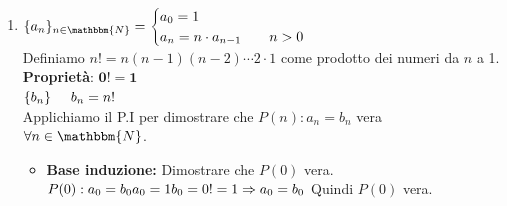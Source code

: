 \documentclass[12pt, letterpaper]{report}
\begin{document}
\begin{enumerate}
 			\\
 			$\{b_n\}_{n \in \mathbbm{N}} \hspace{0.5cm} b_n = x \cdot d^n \ \forall n \in \mathbbm{N}$ \\
 			Applichiamo il P.I. per dimostrare che $P(n): a_n = b_n \ \forall n \in \mathbbm{N}$ vera.
 			\begin{itemize}
 				\item \textbf{Base induzione:} Dimostrare che $P(0)$ vera. \\
 				$P(0): a_0 = b_0 \\ a_0 = x \\ b_0 = x \cdot d^0 = x \\ \Rightarrow a_0 = b_0$ quindi $P(0)$ vera.
 				\item \textbf{Passo induttivo:} Dimostrare che $\forall k \in \mathbbm{N} \ \ P(k) \ vera \Rightarrow P(k + 1) \ vera$.
 				\\
 				$P(k): a_k = b_k$ vera\\
 				$P(k + 1): a_{k + 1} = b_{k + 1}$ da dimostrare.
 				\\
 				$a_{k + 1} = d \cdot a_{k + 1 - 1} = d \cdot a_k = d \cdot b_k = d \cdot x \cdot d^k = x \cdot d^{k + 1} = b_{k + 1} \\ \Rightarrow P(k + 1)$ vera.
 				\\
 				$\Rightarrow P(n)$ vera $\forall n \in \mathbbm{N}$
 			\end{itemize}
 			\item $\{a_n\}_{n \in \mathbbm{N}} = \begin{cases}
 				a_0 = 1 \\
 				a_n = n \cdot a_{n - 1} \hspace{0.7cm} n > 0
 			\end{cases}$ \\
 			Definiamo $n! = n(n - 1)(n - 2)\cdots2 \cdot 1$ come prodotto dei numeri da $n$ a 1.
 			\\
 			\textbf{Proprietà}: {\color{red} $\mathbf{0! = 1}$}
 			\\
 			$\{b_n\} \hspace{0.5cm} b_n = n!$
 			\\
 			Applichiamo il P.I per dimostrare che $P(n): a_n = b_n$ vera $\forall n \in \mathbbm{N}$.
 			\begin{itemize}
 				\item \textbf{Base induzione:} Dimostrare che $P(0)$ vera. \\
 				$P(0): a_0 = b_0 \\ a_0 = 1 \\ b_0 = 0! = 1 \\ \Rightarrow a_0=b_0$ Quindi $P(0)$ vera.

\end{itemize}
\end{enumerate}
\end{document}

